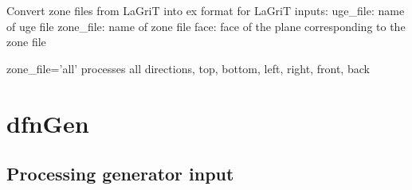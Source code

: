 \documentclass[letterpaper,10pt,english]{sphinxmanual}
\begin{document}
\begin{fulllineitems}
\begin{fulllineitems}
\label{pydfnworks:pydfnworks.DFNWORKS.zone2ex}
Convert zone files from LaGriT into ex format for LaGriT
inputs:
uge\_file: name of uge file
zone\_file: name of zone file
face: face of the plane corresponding to the zone file

zone\_file='all' processes all directions, top, bottom, left, right, front, back

\end{fulllineitems}


\end{fulllineitems}



\section{dfnGen}
\label{pydfnworks:dfngen}

\subsection{Processing generator input}
\label{pydfnworks:processing-generator-input}\label{pydfnworks:module-pydfnworks.gen_input}
\end{document}
